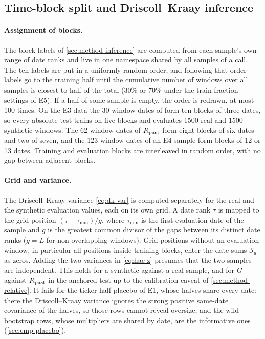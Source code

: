 \subsection{Time-block split and Driscoll--Kraay inference}\label{app:impl-split}

\paragraph{Assignment of blocks.}
The block labels of \cref{sec:method-inference} are computed from each sample's own range of
date ranks and live in one namespace shared by all samples of a call. The ten labels are put in
a uniformly random order, and following that order labels go to the training half until the
cumulative number of windows over all samples is closest to half of the total (30\% or 70\%
under the train-fraction settings of E5). If a half of some sample is empty, the order is
redrawn, at most 100 times. On the E3 data the 30 window dates of \TEST{} form ten blocks of
three dates, so every absolute test trains on five blocks and evaluates 1500 real and 1500
synthetic windows. The 62 window dates of $R_{\mathrm{past}}$ form eight blocks of six dates and two of
seven, and the 123 window dates of an E4 \TEST{} sample form blocks of 12 or 13 dates. Training
and evaluation blocks are interleaved in random order, with no gap between adjacent blocks.

\paragraph{Grid and variance.}
The Driscoll--Kraay variance \eqref{eq:dk-var} is computed separately for the real and the
synthetic evaluation values, each on its own grid. A date rank $\tau$ is mapped to the grid
position $(\tau-\tau_{\min})/g$, where $\tau_{\min}$ is the first evaluation date of the sample
and $g$ is the greatest common divisor of the gaps between its distinct date ranks ($g=L$ for
non-overlapping windows). Grid positions without an evaluation window, in particular all
positions inside training blocks, enter the date sums $\mathcal S_u$ as zeros. Adding the two
variances in \eqref{eq:hac-z} presumes that the two samples are independent. This holds for a
synthetic against a real sample, and for $G$ against $R_{\mathrm{past}}$ in the anchored test up to the
calibration caveat of \cref{sec:method-relative}. It fails for the ticker-half placebo of E1,
whose halves share every date: there the Driscoll--Kraay variance ignores the strong positive
same-date covariance of the halves, so those rows cannot reveal oversize, and the wild-bootstrap
rows, whose multipliers are shared by date, are the informative ones (\cref{sec:emp-placebo}).


